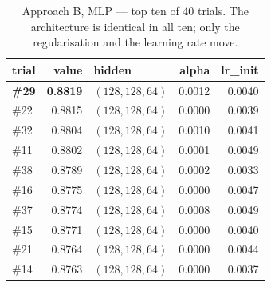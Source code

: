 \begin{table}[H]
\centering
\caption{Approach B, MLP --- top ten of 40 trials. The architecture is identical
in all ten; only the regularisation and the learning rate move.}
\label{tab:app:optBmlp}
\scriptsize
\begin{tabular}{@{}lrlrr@{}}
\toprule
\textbf{trial} & \textbf{value} & \textbf{hidden} & \textbf{alpha} &
\textbf{lr\_init} \\
\midrule
\textbf{\#29} & \textbf{0.8819} & $(128,128,64)$ & 0.0012 & 0.0040 \\
\#22 & 0.8815 & $(128,128,64)$ & 0.0000 & 0.0039 \\
\#32 & 0.8804 & $(128,128,64)$ & 0.0010 & 0.0041 \\
\#11 & 0.8802 & $(128,128,64)$ & 0.0001 & 0.0049 \\
\#38 & 0.8789 & $(128,128,64)$ & 0.0002 & 0.0033 \\
\#16 & 0.8775 & $(128,128,64)$ & 0.0000 & 0.0047 \\
\#37 & 0.8774 & $(128,128,64)$ & 0.0008 & 0.0049 \\
\#15 & 0.8771 & $(128,128,64)$ & 0.0000 & 0.0040 \\
\#21 & 0.8764 & $(128,128,64)$ & 0.0000 & 0.0044 \\
\#14 & 0.8763 & $(128,128,64)$ & 0.0000 & 0.0037 \\
\bottomrule
\end{tabular}
\end{table}

